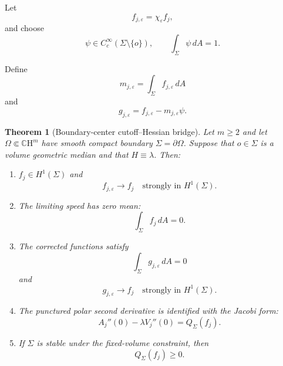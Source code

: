 \documentclass[11pt,reqno]{amsart}
\numberwithin{equation}{section}
\newtheorem{theorem}{Theorem}[section]
\theoremstyle{definition}
\theoremstyle{remark}
\newcommand{\CH}{\mathbb{C}\mathrm{H}}
\newcommand{\eps}{\varepsilon}
\begin{document}
Let
\[
f_{j,\eps}
=
\chi_\eps f_j,
\]
and choose
\[
\psi\in C_c^\infty(\Sigma\setminus\{o\}),
\qquad
\int_\Sigma\psi\,dA=1.
\]

Define
\[
m_{j,\eps}
=
\int_\Sigma f_{j,\eps}\,dA
\]
and
\begin{equation}
g_{j,\eps}
=
f_{j,\eps}-m_{j,\eps}\psi.
\label{eq:mean-corrected-speed-rigorous}
\end{equation}

\begin{theorem}[Boundary-center cutoff--Hessian bridge]
\label{thm:boundary-Hessian-bridge}
Let \(m\ge2\) and let \(\Omega\Subset\CH^m\) have smooth compact boundary
\(\Sigma=\partial\Omega\). Suppose that \(o\in\Sigma\) is a volume geometric
median and that \(H\equiv\lambda\). Then:

\begin{enumerate}[label=\textup{(\roman*)}]

\item
\(f_j\in H^1(\Sigma)\) and
\[
f_{j,\eps}\longrightarrow f_j
\quad\text{strongly in }H^1(\Sigma).
\]

\item
The limiting speed has zero mean:
\[
\int_\Sigma f_j\,dA=0.
\]

\item
The corrected functions satisfy
\[
\int_\Sigma g_{j,\eps}\,dA=0
\]
and
\[
g_{j,\eps}\longrightarrow f_j
\quad\text{strongly in }H^1(\Sigma).
\]

\item
The punctured polar second derivative is identified with the Jacobi form:
\[
A_j''(0)-\lambda V_j''(0)
=
Q_\Sigma(f_j).
\]

\item
If \(\Sigma\) is stable under the fixed-volume constraint, then
\begin{equation}
Q_\Sigma(f_j)\ge0.
\label{eq:boundary-stability-rigorous}
\end{equation}

\end{enumerate}
\end{theorem}
\end{document}

